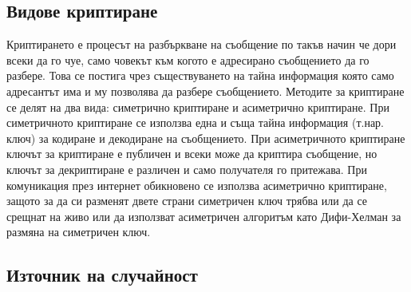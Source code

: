 \subsection{Видове криптиране}
Криптирането е процесът на разбъркване на съобщение по такъв начин че дори всеки да го чуе, само човекът към когото е адресирано съобщението да го разбере. Това се постига чрез съществуването на тайна информация която само адресантът има и му позволява да разбере съобщението. Методите за криптиране се делят на два вида: симетрично криптиране и асиметрично криптиране. При симетричното криптиране се използва една и съща тайна информация (т.нар. ключ) за кодиране и декодиране на съобщението. При асиметричното криптиране ключът за криптиране е публичен и всеки може да криптира съобщение, но ключът за декриптиране е различен и само получателя го притежава. При комуникация през интернет обикновено се използва асиметрично криптиране, защото за да си разменят двете страни симетричен ключ трябва или да се срещнат на живо или да използват асиметричен алгоритъм като Дифи-Хелман за размяна на симетричен ключ.

\subsection{Източник на случайност}
